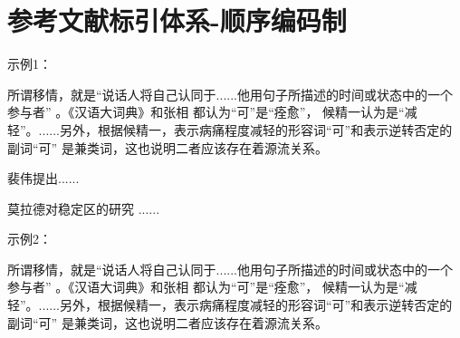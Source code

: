 \documentclass{article}
\begin{document}
\section{参考文献标引体系-顺序编码制}

\begin{refsection}
示例1：

所谓移情，就是“说话人将自己认同于......他用句子所描述的时间或状态中的一个参与者”
\cite{Sunstein1996-903-903}。《汉语大词典》和张相
\cite{Morri2010--}都认为“可”是“痊愈”，
候精一认为是“减轻”\cite{罗杰斯2011-15-16}。......另外，根据候精一，表示病痛程度减轻的形容词“可”和表示逆转否定的副词“可”
是兼类词\cite{陈登原2000-29-29}，这也说明二者应该存在着源流关系。

裴伟提出\cite{Humphrey1971--,KENNEDY1975-311-386}......

莫拉德对稳定区的研究
\cite{KENNEDY1975-311-386,CRANE1972--,Weinstein1974-745-772}......

示例2：

所谓移情，就是“说话人将自己认同于......他用句子所描述的时间或状态中的一个参与者”
。《汉语大词典》和张相
都认为“可”是“痊愈”，
候精一认为是“减轻”。......另外，根据候精一，表示病痛程度减轻的形容词“可”和表示逆转否定的副词“可”
是兼类词，这也说明二者应该存在着源流关系。

\printbibliography[heading=subbibliography,title={参考文献}]
\end{refsection}
\end{document}
